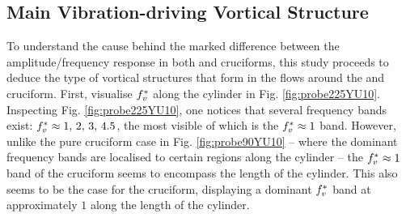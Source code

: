 \documentclass[oneside]{utmthesis}
\begin{document}
\subsection{Main Vibration-driving Vortical Structure}\label{ssec:kvivRegimeVortStruct}

To understand the cause behind the marked difference between the amplitude/frequency response in both \angfo{} and \angth{} cruciforms, this study proceeds to deduce the type of vortical structures that form in the flows around the \angtw{} and \angon{} cruciform. First, visualise $f^{*}_{v}$ along the cylinder in Fig. \ref{fig:probe225YU10}. Inspecting Fig. \ref{fig:probe225YU10}, one notices that several frequency bands exist: $f^{*}_{v} \approx 1,\, 2,\, 3,\, 4.5$, the most visible of which is the $f^{*}_{v} \approx 1$ band. However, unlike the pure cruciform case in Fig. \ref{fig:probe90YU10} -- where the dominant frequency bands are localised to certain regions along the cylinder -- the $f^{*}_{v} \approx 1$ band of the \angtw{} cruciform seems to encompass the length of the cylinder. This also seems to be the case for the \angon{} cruciform, displaying a dominant $f^{*}_{v}$ band at approximately $1$ along the length of the cylinder.
\end{document}
